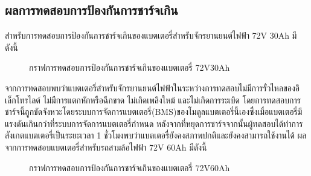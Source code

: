 \subsection{ผลการทดสอบการป้องกันการชาร์จเกิน}
สำหรับการทดสอบการป้องกันการชาร์จเกินของแบตเตอรี่สำหรับจักรยานยนต์ไฟฟ้า 72V 30Ah มีดังนี้
\begin{center}
	\begin{figure}[H]
		\centering
		\captionsetup{justification=centering,margin=2cm}
		\caption{กราฟการทดสอบการป้องกันการชาร์จเกินของแบตเตอรี่ 72V30Ah}
	\end{figure}
\end{center}
จากการทดสอบพบว่าแบตเตอรี่สำหรับจักรยานยนต์ไฟฟ้าในระหว่างการทดสอบไม่มีการรั่วไหลของอิเล็กโทรไลต์ ไม่มีการแตกหักหรือฉีกขาด ไม่เกิดเพลิงใหม้ และไม่เกิดการระเบิด
โดยการทดสอบการชาร์จนี้ถูกขัดจังหวะโดยระบบการจัดการแบตเตอรี่(BMS)ของโมดูลแบตเตอรี่นี้เองซึ่งเมื่อแบตเตอรี่มีแรงดันเกินกว่าที่ระบบการจัดการแบตเตอรี่กำหนด
หลังจากที่หยุดการชาร์จจากนั้นผู้ทดสอบได้ทำการสังเกตแบตเตอรี่เป็นระยะเวลา 1 ชั่วโมงพบว่าแบตเตอรี่ยังคงสภาพปกติและยังคงสามารถใช้งานได้
\newline
ผลจากการทดสอบแบตเตอรี่สำหรับรถสามล้อไฟฟ้า 72V 60Ah มีดังนี้
\begin{center}
	\begin{figure}[H]
		\centering
		\captionsetup{justification=centering,margin=2cm}
		\caption{กราฟการทดสอบการป้องกันการชาร์จเกินของแบตเตอรี่ 72V60Ah}
	\end{figure}
\end{center}
